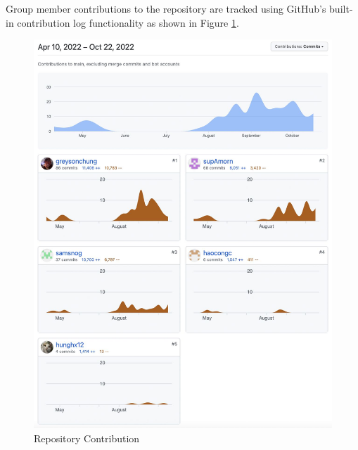\documentclass[11pt, oneside]{article}
\begin{document}
\noindent Group member contributions to the repository are tracked using GitHub's built-in contribution log functionality as shown in Figure \ref{repo-contribution}.

\begin{figure}[H]
    \centering
    \includegraphics[scale=0.35]{images/repo-contribution.jpeg}
    \caption{Repository Contribution}
    \label{repo-contribution}
\end{figure}
\end{document}
